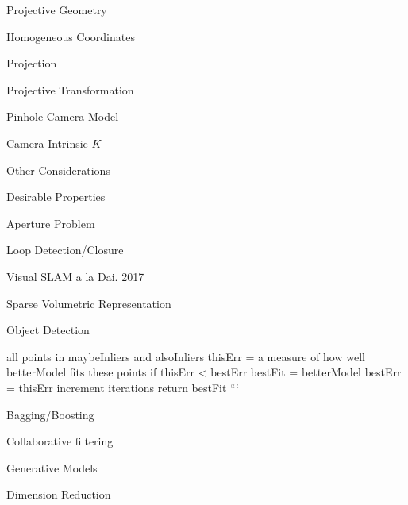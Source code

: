 \begin{section}
\begin{subsubsection}
\begin{subsubsection}
\begin{subsubsection}
\begin{section}{Projective Geometry}
\begin{subsection}{Homogeneous Coordinates}
\begin{subsubsection}
{\begin{subsubsection}{Projection}
\begin{subsubsection}{Projective Transformation}
\begin{subsection}
\begin{subsubsection}
\begin{subsubsection}
\begin{subsubsection}
{\begin{subsubsection}
\begin{subsection}
\begin{subsection} {Pinhole Camera Model}
\begin{subsection} {Camera Intrinsic $K$}
\begin{subsection}
\begin{subsection}
\begin{subsubsection}{Other Considerations}
{\begin{subsection}
\begin{subsubsection}{Desirable Properties}
\begin{section}
\begin{subsection}
\begin{subsection}
\begin{subsection}
\begin{section}
\begin{subsection}
\begin{subsubsection}
\begin{subsubsection}
\begin{subsection}
\begin{section}
\begin{subsection}
\begin{subsubsection}{Aperture Problem}
\begin{subsubsection}
{\begin{section}
\begin{subsubsection}
\begin{subsubsection}
\begin{subsubsection}
\begin{subsection}
\begin{subsection}
\begin{subsection}
\begin{subsection}
\begin{subsection}
\begin{subsection}
\begin{subsection}
\begin{subsubsection}
{\begin{subsubsection}
{\begin{subsubsection}
\begin{section}
\begin{section}
\begin{section}
\begin{subsubsection}
\begin{subsubsection}{Loop Detection/Closure}
\begin{subsubsection}{Visual SLAM a la Dai. 2017}
\begin{subsubsection}{Sparse Volumetric Representation}
\begin{subsection}
\begin{section}{Object Detection}
\begin{subsubsection}
{\begin{subsection}
\begin{subsection}
\begin{section}
\begin{section}
\begin{subsection}
\begin{subsubsection}
\begin{subsubsection}
\begin{subsection}
\begin{subsection}
\begin{subsubsection}
\begin{subsubsection}
\begin{subsubsection}
{\begin{subsection}
\begin{subsection}
\begin{subsection}
\begin{subsection}
\begin{section}
\begin{subsection}
\begin{subsubsection}
\begin{subsubsection}
\begin{subsubsection}
\begin{subsubsection}
\begin{subsubsection}
\begin{subsubsection}
\begin{subsection}
\begin{subsubsection}
\begin{subsection}
\begin{subsection}
\begin{subsubsection}
\begin{subsubsection}
\begin{subsection}
\begin{subsubsection}
{{\begin{section}
\begin{section}
\begin{subsection}
{{{\begin{subsubsection}
\begin{subsubsection}
\begin{subsection}
{\begin{section}
{{all points in maybeInliers and alsoInliers
        thisErr = a measure of how well betterModel fits these points
        if thisErr < bestErr {
            bestFit = betterModel
            bestErr = thisErr
        }
    }
    increment iterations
}
return bestFit
```



\begin{section} Bagging/Boosting

Collaborative filtering

\begin{section} Generative Models

\begin{section} Dimension Reduction

\end{section}
\end{section}
\end{section}
\end{section}}
\end{subsection}
\end{subsubsection}
\end{subsubsection}}}}
\end{subsection}
\end{section}
\end{section}}}
\end{subsubsection}
\end{subsection}
\end{subsubsection}
\end{subsubsection}
\end{subsection}
\end{subsection}
\end{subsubsection}
\end{subsection}
\end{subsubsection}
\end{subsubsection}
\end{subsubsection}
\end{subsubsection}
\end{subsubsection}
\end{subsubsection}
\end{subsection}
\end{section}
\end{subsection}
\end{subsection}
\end{subsection}
\end{subsection}}
\end{subsubsection}
\end{subsubsection}
\end{subsubsection}
\end{subsection}
\end{subsection}
\end{subsubsection}
\end{subsubsection}
\end{subsection}
\end{section}
\end{section}
\end{subsection}
\end{subsection}}
\end{subsubsection}
\end{section}
\end{subsection}
\end{subsubsection}
\end{subsubsection}
\end{subsubsection}
\end{subsubsection}
\end{section}
\end{section}
\end{section}
\end{subsubsection}}
\end{subsubsection}}
\end{subsubsection}
\end{subsection}
\end{subsection}
\end{subsection}
\end{subsection}
\end{subsection}
\end{subsection}
\end{subsection}
\end{subsubsection}
\end{subsubsection}
\end{subsubsection}
\end{section}}
\end{subsubsection}
\end{subsubsection}
\end{subsection}
\end{section}
\end{subsection}
\end{subsubsection}
\end{subsubsection}
\end{subsection}
\end{section}
\end{subsection}
\end{subsection}
\end{subsection}
\end{section}
\end{subsubsection}
\end{subsection}}
\end{subsubsection}
\end{subsection}
\end{subsection}
\end{subsection}
\end{subsection}
\end{subsection}
\end{subsubsection}}
\end{subsubsection}
\end{subsubsection}
\end{subsubsection}
\end{subsection}
\end{subsubsection}
\end{subsubsection}}
\end{subsubsection}
\end{subsection}
\end{section}
\end{subsubsection}
\end{subsubsection}
\end{subsubsection}
\end{section}
